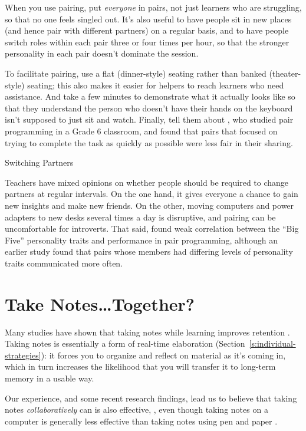 When you use pairing, put \emph{everyone} in pairs, not just learners who are
struggling, so that no one feels singled out. It's also useful to have
people sit in new places (and hence pair with different partners) on a
regular basis, and to have people switch roles within each pair three or
four times per hour, so that the stronger personality in each pair
doesn't dominate the session.

To facilitate pairing, use a flat (dinner-style) seating rather than
banked (theater-style) seating; this also makes it easier for helpers to
reach learners who need assistance. And take a few minutes to
demonstrate what it actually looks like so that they understand the
person who doesn't have their hands on the keyboard isn't supposed to
just sit and watch. Finally, tell them about \cite{Lewi2015}, who
studied pair programming in a Grade 6 classroom, and found that pairs
that focused on trying to complete the task as quickly as possible were
less fair in their sharing.

\begin{aside}{Switching Partners}

Teachers have mixed opinions on whether people should be required to
change partners at regular intervals. On the one hand, it gives
everyone a chance to gain new insights and make new friends. On the
other, moving computers and power adapters to new desks several times
a day is disruptive, and pairing can be uncomfortable for introverts.
That said, \cite{Hann2010} found weak correlation between the ``Big
Five'' personality traits and performance in pair programming, although
an earlier study \cite{Wall2009} found that pairs whose members had
differing levels of personality traits communicated more often.

\end{aside}

\section{Take Notes{\ldots}Together?}\label{s:classroom-notetaking}

Many studies have shown that taking notes while learning improves
retention \cite{Aike1975,Boha2011}. Taking notes is essentially a
form of real-time elaboration (Section~\ref{s:individual-strategies}): it
forces you to organize and reflect on material as it's coming in, which
in turn increases the likelihood that you will transfer it to long-term
memory in a usable way.

Our experience, and some recent research findings, lead us to believe
that taking notes \emph{collaboratively} can is also effective,
\cite{Ornd2015,Yang2015}, even though taking notes on a
computer is generally less effective than taking notes using pen and
paper \cite{Muel2014}.

